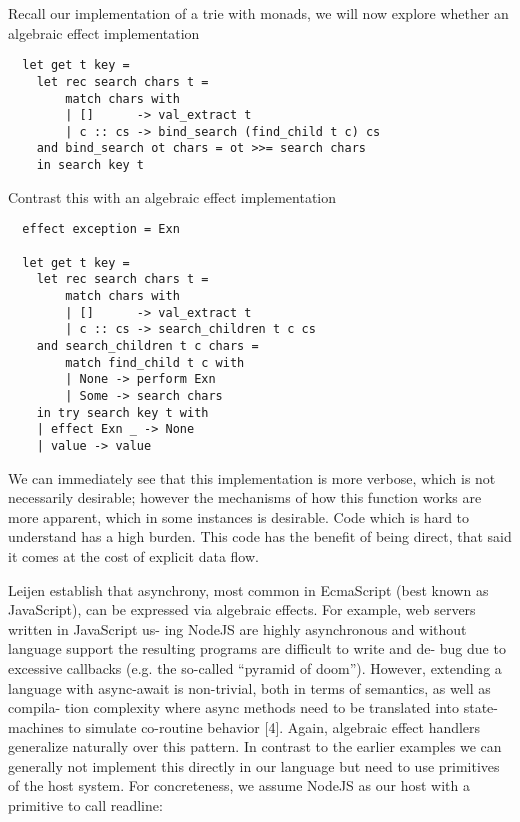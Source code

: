 Recall our implementation of a trie with monads,
we will now explore whether an algebraic effect implementation
\begin{verbatim}
  let get t key =
    let rec search chars t =
        match chars with
        | []      -> val_extract t
        | c :: cs -> bind_search (find_child t c) cs
    and bind_search ot chars = ot >>= search chars
    in search key t
\end{verbatim}

Contrast this with an algebraic effect implementation

\begin{verbatim}
  effect exception = Exn

  let get t key =
    let rec search chars t =
        match chars with
        | []      -> val_extract t
        | c :: cs -> search_children t c cs
    and search_children t c chars =
        match find_child t c with
        | None -> perform Exn
        | Some -> search chars
    in try search key t with
    | effect Exn _ -> None
    | value -> value
\end{verbatim}

We can immediately see that this implementation is more verbose,
which is not necessarily desirable;
however the mechanisms of how this function works
are more apparent, which in some instances is desirable.
Code which is hard to understand has a high burden.
This code has the benefit of being direct, that said
it comes at the cost of explicit data flow.


Leijen\cite{leijen2017structured} establish that
asynchrony, most common in EcmaScript (best known as JavaScript),
can be expressed via algebraic effects.
For example, web servers written in JavaScript us- ing NodeJS are highly asynchronous and without language support the resulting programs are difficult to write and de- bug due to excessive callbacks (e.g. the so-called “pyramid of doom”). However, extending a language with async-await is non-trivial, both in terms of semantics, as well as compila- tion complexity where async methods need to be translated into state-machines to simulate co-routine behavior [4].
Again, algebraic effect handlers generalize naturally over this pattern. In contrast to the earlier examples we can generally not implement this directly in our language but need to use primitives of the host system. For concreteness, we assume NodeJS as our host with a primitive to call readline:

